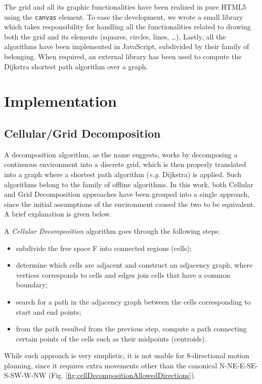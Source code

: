 \documentclass[conference]{IEEEtran}
\begin{document}
The grid and all its graphic functionalities have been realized in pure HTML5 using the \texttt{canvas} element. To ease the development, we wrote a small library which takes responsibility for handling all the functionalities related to drawing both the grid and its elements (squares, circles, lines, \dots).
Lastly, all the algorithms have been implemented in JavaScript, subdivided by their family of belonging. When required, an external library has been used to compute the Dijkstra shortest path algorithm over a graph.

\section{Implementation}

\subsection{Cellular/Grid Decomposition}
A decomposition algorithm, as the name suggests, works by decomposing a continuous environment into a discrete grid, which is then properly translated into a graph where a shortest path algorithm (\emph{e.g.} Dijkstra) is applied. Such algorithms belong to the family of offline algorithms.
In this work, both Cellular and Grid Decomposition approaches have been grouped into a single approach, since the initial assumptions of the environment caused the two to be equivalent. A brief explanation is given below.

A \emph{Cellular Decomposition} algorithm goes through the following steps:
\begin{itemize}
	\item subdivide the free space F into connected regions (cells);
	\item determine which cells are adjacent and construct an adjacency graph, where vertices corresponds to cells and edges join cells that have a common boundary;
	\item search for a path in the adjacency graph between the cells corresponding to start and end points;
	\item from the path resulted from the previous step, compute a path connecting certain points of the cells such as their midpoints (centroids).
\end{itemize}

While such approach is very simplistic, it is not usable for 8-directional motion planning, since it requires extra movements other than the canonical N-NE-E-SE-S-SW-W-NW (Fig. \ref{fig:cellDecompositionAllowedDirections}).
\end{document}
